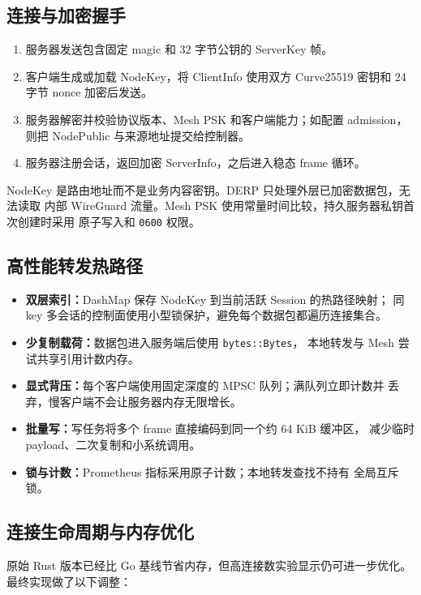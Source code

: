 \documentclass[UTF8,a4paper,zihao=-4]{ctexart}
\newcommand{\code}[1]{\texttt{\small #1}}
\begin{document}
\subsection{连接与加密握手}

\begin{enumerate}
  \item 服务器发送包含固定 magic 和 32 字节公钥的 ServerKey 帧。
  \item 客户端生成或加载 NodeKey，将 ClientInfo 使用双方 Curve25519 密钥和
    24 字节 nonce 加密后发送。
  \item 服务器解密并校验协议版本、Mesh PSK 和客户端能力；如配置 admission，
    则把 NodePublic 与来源地址提交给控制器。
  \item 服务器注册会话，返回加密 ServerInfo，之后进入稳态 frame 循环。
\end{enumerate}

NodeKey 是路由地址而不是业务内容密钥。DERP 只处理外层已加密数据包，无法读取
内部 WireGuard 流量。Mesh PSK 使用常量时间比较，持久服务器私钥首次创建时采用
原子写入和 \code{0600} 权限。

\subsection{高性能转发热路径}

\begin{itemize}
  \item \textbf{双层索引：}DashMap 保存 NodeKey 到当前活跃 Session 的热路径映射；
    同 key 多会话的控制面使用小型锁保护，避免每个数据包都遍历连接集合。
  \item \textbf{少复制载荷：}数据包进入服务端后使用 \code{bytes::Bytes}，
    本地转发与 Mesh 尝试共享引用计数内存。
  \item \textbf{显式背压：}每个客户端使用固定深度的 MPSC 队列；满队列立即计数并
    丢弃，慢客户端不会让服务器内存无限增长。
  \item \textbf{批量写：}写任务将多个 frame 直接编码到同一个约 64 KiB 缓冲区，
    减少临时 payload、二次复制和小系统调用。
  \item \textbf{锁与计数：}Prometheus 指标采用原子计数；本地转发查找不持有
    全局互斥锁。
\end{itemize}

\subsection{连接生命周期与内存优化}

原始 Rust 版本已经比 Go 基线节省内存，但高连接数实验显示仍可进一步优化。
最终实现做了以下调整：
\end{document}
